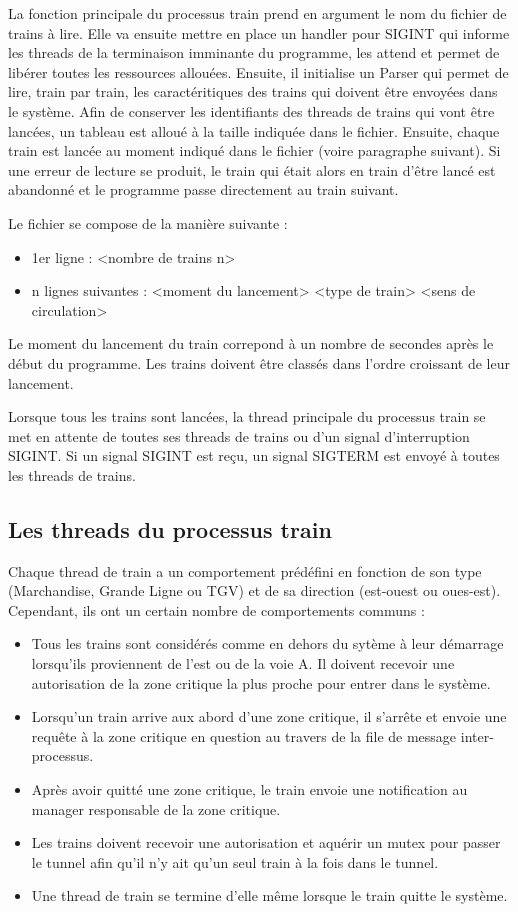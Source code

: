 \documentclass[a4paper,12pt]{article}
\begin{document}
La fonction principale du processus train prend en argument le nom du fichier de trains à lire. Elle va ensuite mettre en place un handler pour SIGINT qui informe les threads de la terminaison imminante du programme, les attend et permet de libérer toutes les ressources allouées. Ensuite, il initialise un Parser qui permet de lire, train par train, les caractéritiques des trains qui doivent être envoyées dans le système. Afin de conserver les identifiants des threads de trains qui vont être lancées, un tableau est alloué à la taille indiquée dans le fichier. Ensuite, chaque train est lancée au moment indiqué dans le fichier (voire paragraphe suivant). Si une erreur de lecture se produit, le train qui était alors en train d'être lancé est abandonné et le programme passe directement au train suivant.

Le fichier se compose de la manière suivante :

\begin{itemize}
	\item 1er ligne : <nombre de trains n>
	\item n lignes suivantes : <moment du lancement> <type de train> <sens de circulation>
\end{itemize}

Le moment du lancement du train correpond à un nombre de secondes après le début du programme. Les trains doivent être classés dans l'ordre croissant de leur lancement.

Lorsque tous les trains sont lancées, la thread principale du processus train se met en attente de toutes ses threads de trains ou d'un signal d'interruption SIGINT. Si un signal SIGINT est reçu, un signal SIGTERM est envoyé à toutes les threads de trains.

\subsection{Les threads du processus train}

Chaque thread de train a un comportement prédéfini en fonction de son type (Marchandise, Grande Ligne ou TGV) et de sa direction (est-ouest ou oues-est). Cependant, ils ont un certain nombre de comportements communs :
\begin{itemize}
	\item Tous les trains sont considérés comme en dehors du sytème à leur démarrage lorsqu'ils proviennent de l'est ou de la voie A. Il doivent recevoir une autorisation de la zone critique la plus proche pour entrer dans le système.
	\item Lorsqu'un train arrive aux abord d'une zone critique, il s'arrête et envoie une requête à la zone critique en question au travers de la file de message inter-processus.
	\item Après avoir quitté une zone critique, le train envoie une notification au manager responsable de la zone critique.
	\item Les trains doivent recevoir une autorisation et aquérir un mutex pour passer le tunnel afin qu'il n'y ait qu'un seul train à la fois dans le tunnel.
	\item Une thread de train se termine d'elle même lorsque le train quitte le système.
\end{itemize}
\end{document}
